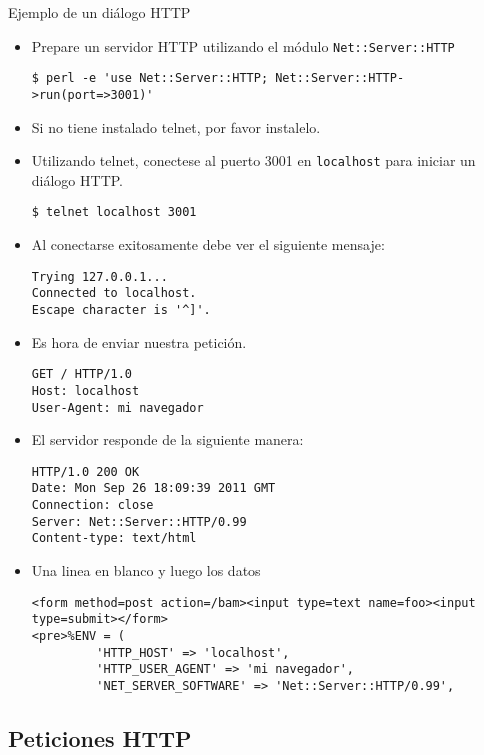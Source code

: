\begin{frame}{Ejemplo de un diálogo HTTP} %

\begin{itemize}
    \item Prepare un servidor HTTP utilizando el módulo
    \texttt{Net::Server::HTTP}
    \footnotesize{
    \begin{verbatim}
$ perl -e 'use Net::Server::HTTP; Net::Server::HTTP->run(port=>3001)'
    \end{verbatim}
    }
    \item Si no tiene instalado telnet, por favor instalelo. 
    \item Utilizando telnet, conectese al puerto 3001 en \texttt{localhost}
    para iniciar un diálogo HTTP. 
    \begin{verbatim}
$ telnet localhost 3001
    \end{verbatim}
    \item Al conectarse exitosamente debe ver el siguiente mensaje: 
    \begin{verbatim}
Trying 127.0.0.1...
Connected to localhost.
Escape character is '^]'.
    \end{verbatim}
    \item Es hora de enviar nuestra petición. 
\begin{verbatim}
GET / HTTP/1.0 
Host: localhost
User-Agent: mi navegador 
\end{verbatim}
    \item El servidor responde de la siguiente manera: 
\begin{verbatim}
HTTP/1.0 200 OK
Date: Mon Sep 26 18:09:39 2011 GMT
Connection: close
Server: Net::Server::HTTP/0.99
Content-type: text/html

\end{verbatim}
    \item Una linea en blanco y luego los datos 
\begin{verbatim}
<form method=post action=/bam><input type=text name=foo><input type=submit></form>
<pre>%ENV = (
         'HTTP_HOST' => 'localhost',
         'HTTP_USER_AGENT' => 'mi navegador',
         'NET_SERVER_SOFTWARE' => 'Net::Server::HTTP/0.99',
\end{verbatim}

\end{itemize}
\end{frame}

\subsection{Peticiones HTTP} %

